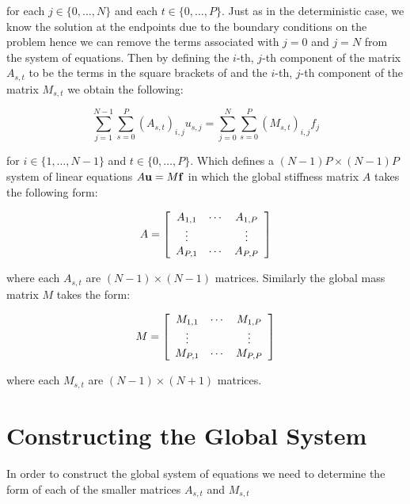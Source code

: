 for each $j \in \{0,\ldots,N\}$ and each $t \in \{0,\ldots,P\}$. Just as in
the deterministic case, we know the solution at the endpoints due to the
boundary conditions on the problem  hence we can
remove the terms associated with $j = 0$ and $j = N$ from the system of
equations. Then by defining the $i$-th, $j$-th component of the matrix
$A_{s,t}$ to be the terms in the square brackets of
 and the $i$-th, $j$-th component of the
matrix $M_{s,t}$ we obtain the following:

\begin{equation}
    \sum_{j=1}^{N - 1}\sum_{s=0}^P(A_{s,t})_{i,j}u_{s,j} =
    \sum_{j=0}^N\sum_{s=0}^P(M_{s,t})_{i,j}f_j
\end{equation}

for $i \in \{1,\ldots,N - 1\}$ and $t \in \{0,\ldots,P\}$. Which defines a
$(N - 1)P \times (N - 1)P$ system of linear equations $A\mathbf{u} = M\mathbf{f}$ in
which the global stiffness matrix $A$ takes the following form:

\begin{equation}
    A = \left[\begin{array}{c c c}
            A_{1,1} & \cdots & A_{1,P} \\
            \vdots & & \vdots \\
            A_{P,1} & \cdots & A_{P,P}
        \end{array}\right]
\end{equation}

where each $A_{s,t}$ are $(N - 1) \times (N - 1)$ matrices. Similarly the
global mass matrix $M$ takes the form:

\begin{equation}
    M = \left[\begin{array}{c c c}
            M_{1,1} & \cdots & M_{1,P} \\
            \vdots & & \vdots \\
            M_{P,1} & \cdots & M_{P,P}
        \end{array}\right]
\end{equation}

where each $M_{s,t}$ are $(N - 1) \times (N + 1) $ matrices.

\section{Constructing the Global System}

In order to construct the global system of equations we need to determine the
form of each of the smaller matrices $A_{s,t}$ and $M_{s,t}$

